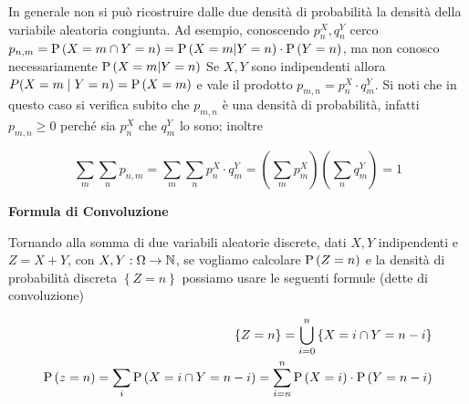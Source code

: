 In generale non si pu\`o  ricostruire dalle due densit\`a di probabilit\`a  la densit\`a della variabile aleatoria congiunta. Ad esempio, conoscendo $ p^X_n,q^Y_n $ cerco $ p_{n,m}  = \text{P}\left(X = m \cap Y = n\right) = \text{P}\left(X = m | Y = n\right) \cdot \text{P}\left(Y=n\right) $, ma non conosco necessariamente $\text{P}\left(X = m | Y = n\right)$
Se $ X,Y $ sono indipendenti allora $ P(X=m \mid Y=n) = \text{P}\left(X=m\right) $ e vale il prodotto $ p_{m,n} = p^X_n \cdot q^Y_m $.
Si noti che in questo caso si verifica subito che  $ p_{m,n} $  \`e  una densit\`a  di probabilit\`a, infatti
$ p_{m,n}\ge0 $ perch\'e sia $p^X_n$  che $q^Y_m $ lo sono; inoltre

\begin{equation*}
    \sum_{m}\sum_{n} p_{n,m} = \sum_{m}\sum_{n} p^X_n \cdot q^Y_m
 = \left( \sum_{m} p^X_m \right) \left( \sum_{n} q^Y_m \right) = 1
\end{equation*}



\begin{defn}
    \textbf{Formula di Convoluzione}

    Tornando alla somma di due variabili aleatorie discrete, dati $ X,Y $ indipendenti e $ Z = X + Y $, con $ X,Y : \Omega \to \mathbb{N} $, se vogliamo calcolare $ \text{P}\left(Z = n\right) $ e la densit\`a  di probabilit\`a  discreta $ \left\{Z = n\right\} $ possiamo usare le seguenti formule (dette di convoluzione)

    \begin{equation*}
    \begin{aligned}
    \left\{Z = n\right\} = \bigcup_{i=0}^{n} \left\{X = i \cap Y = n - i \right\} \\
    \text{P}\left(z=n\right) = \sum_{i} \text{P}\left(X = i \cap Y = n-i\right) = \sum_{i = n}^{n} \text{P}\left(X=i\right) \cdot \text{P}\left(Y=n-i\right)
    \end{aligned} 
    \end{equation*}
\end{defn}


